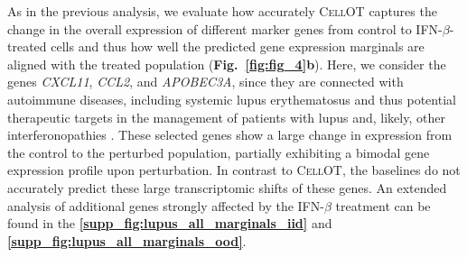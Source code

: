 As in the previous analysis, we evaluate how accurately \textsc{CellOT} captures the change in the overall expression of different marker genes from control to IFN-$\beta$-treated cells and thus how well the predicted gene expression marginals are aligned with the treated population (\textbf{Fig.~\ref{fig:fig_4}b}). Here, we consider the genes \textit{CXCL11}, \textit{CCL2}, and \textit{APOBEC3A},
since they are connected with autoimmune diseases, including systemic lupus erythematosus \cite{hedrich2011epigenetic, perez2021sustained}
and thus potential therapeutic targets
in the management of patients with lupus and, likely, other interferonopathies \cite{mathian2015targeting,rani1996characterization,hedrich2011epigenetic,mathian2015targeting,perez2021sustained,flier2001differential}.
These selected genes show a large change in expression from the control to the perturbed population, partially exhibiting a bimodal gene expression profile upon perturbation. In contrast to \textsc{CellOT}, the baselines do not accurately predict these large transcriptomic shifts of these genes.
An extended analysis of additional genes strongly affected by the IFN-$\beta$ treatment can be found in the \textbf{\ref{supp_fig:lupus_all_marginals_iid}} and \textbf{\ref{supp_fig:lupus_all_marginals_ood}}.


